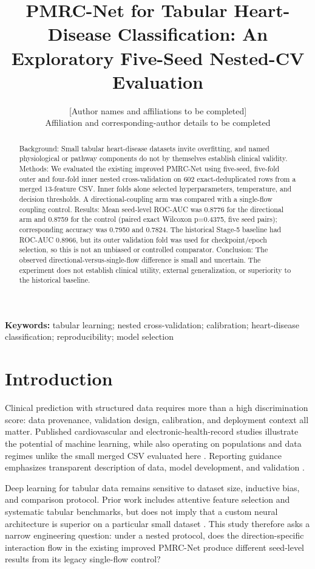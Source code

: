 \documentclass[10pt,twocolumn]{article}
\title{PMRC-Net for Tabular Heart-Disease Classification: An Exploratory Five-Seed Nested-CV Evaluation}
\author{[Author names and affiliations to be completed]\\\small Affiliation and corresponding-author details to be completed}
\date{}
\begin{document}
\maketitle

\begin{abstract}

Background: Small tabular heart-disease datasets invite overfitting, and named physiological or pathway components do not by themselves establish clinical validity. Methods: We evaluated the existing improved PMRC-Net using five-seed, five-fold outer and four-fold inner nested cross-validation on 602 exact-deduplicated rows from a merged 13-feature CSV. Inner folds alone selected hyperparameters, temperature, and decision thresholds. A directional-coupling arm was compared with a single-flow coupling control. Results: Mean seed-level ROC-AUC was 0.8776 for the directional arm and 0.8759 for the control (paired exact Wilcoxon p=0.4375, five seed pairs); corresponding accuracy was 0.7950 and 0.7824. The historical Stage-5 baseline had ROC-AUC 0.8966, but its outer validation fold was used for checkpoint/epoch selection, so this is not an unbiased or controlled comparator. Conclusion: The observed directional-versus-single-flow difference is small and uncertain. The experiment does not establish clinical utility, external generalization, or superiority to the historical baseline.

\end{abstract}

\noindent\textbf{Keywords:} tabular learning; nested cross-validation; calibration; heart-disease classification; reproducibility; model selection



\section{Introduction}

Clinical prediction with structured data requires more than a high discrimination score: data provenance, validation design, calibration, and deployment context all matter. Published cardiovascular and electronic-health-record studies illustrate the potential of machine learning, while also operating on populations and data regimes unlike the small merged CSV evaluated here \cite{Weng2017} \cite{Rajkomar2018}. Reporting guidance emphasizes transparent description of data, model development, and validation \cite{TRIPOD2015}.

Deep learning for tabular data remains sensitive to dataset size, inductive bias, and comparison protocol. Prior work includes attentive feature selection and systematic tabular benchmarks, but does not imply that a custom neural architecture is superior on a particular small dataset \cite{Arik2021} \cite{Gorishniy2021} \cite{Grinsztajn2022}. This study therefore asks a narrow engineering question: under a nested protocol, does the direction-specific interaction flow in the existing improved PMRC-Net produce different seed-level results from its legacy single-flow control?
\end{document}
